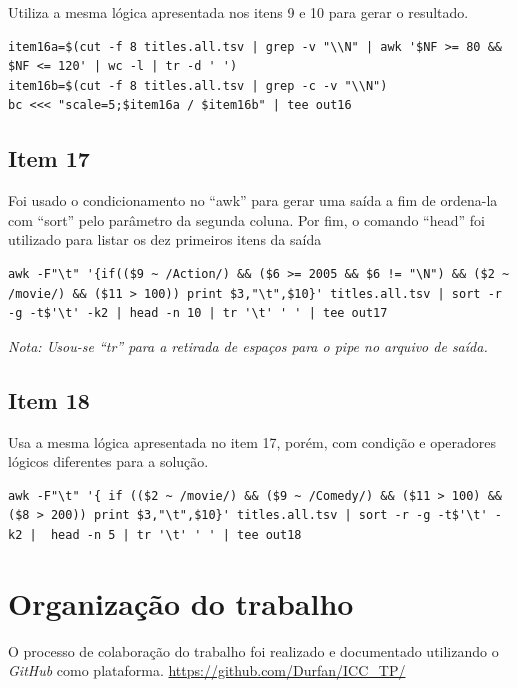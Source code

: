 \documentclass[12pt]{article}
\begin{document}
Utiliza a mesma lógica apresentada nos itens 9 e 10 para gerar o resultado.

\begin{verbatim}
item16a=$(cut -f 8 titles.all.tsv | grep -v "\\N" | awk '$NF >= 80 && $NF <= 120' | wc -l | tr -d ' ')
item16b=$(cut -f 8 titles.all.tsv | grep -c -v "\\N")
bc <<< "scale=5;$item16a / $item16b" | tee out16
\end{verbatim}

\subsection*{Item 17}

Foi usado o condicionamento no ``awk'' para gerar uma saída a fim de ordena-la com ``sort'' pelo parâmetro da segunda coluna. Por fim, o comando ``head'' foi utilizado para listar os dez primeiros itens da saída 

\begin{verbatim}
awk -F"\t" '{if(($9 ~ /Action/) && ($6 >= 2005 && $6 != "\N") && ($2 ~ /movie/) && ($11 > 100)) print $3,"\t",$10}' titles.all.tsv | sort -r -g -t$'\t' -k2 | head -n 10 | tr '\t' ' ' | tee out17
\end{verbatim}

\textit{Nota: Usou-se ``tr'' para a retirada de espaços para o pipe no arquivo de saída.}

\subsection*{Item 18}

Usa a mesma lógica apresentada no item 17, porém, com condição e operadores lógicos diferentes para a solução.

\begin{verbatim}
awk -F"\t" '{ if (($2 ~ /movie/) && ($9 ~ /Comedy/) && ($11 > 100) && ($8 > 200)) print $3,"\t",$10}' titles.all.tsv | sort -r -g -t$'\t' -k2 |  head -n 5 | tr '\t' ' ' | tee out18
\end{verbatim}

\section{Organização do trabalho}

O processo de colaboração do trabalho foi realizado e documentado utilizando o \textit{GitHub} como plataforma. \url{https://github.com/Durfan/ICC_TP/}
\end{document}

